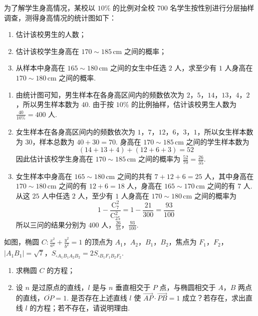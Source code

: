 \begin{problem}
为了解学生身高情况，某校以 \(10\%\) 的比例对全校 \(700\) 名学生按性别进行分层抽样调查，测得身高情况的统计图如下：

\begin{enumerate}
\item 估计该校男生的人数；
\item 估计该校学生身高在 \(170 \sim 185\,\mathrm{cm}\) 之间的概率；
\item 从样本中身高在 \(165 \sim 180\,\mathrm{cm}\) 之间的女生中任选 \(2\) 人，求至少有 \(1\) 人身高在 \(170 \sim 180\,\mathrm{cm}\) 之间的概率.
\end{enumerate}

\end{problem}

\begin{solution}
\begin{enumerate}
\item
由统计图可知，男生样本在各身高区间内的频数依次为 \(2\)，\(5\)，\(14\)，\(13\)，\(4\)，\(2\)，所以男生样本数为 \(40\). 由于按 \(10\%\) 的比例抽样，估计该校男生人数为 \(\frac{40}{10\%}=400\) 人.

\item
女生样本在各身高区间内的频数依次为 \(1\)，\(7\)，\(12\)，\(6\)，\(3\)，\(1\)，所以女生样本数为 \(30\)，样本总数为 \(40+30=70\). 身高在 \(170\sim185\,\mathrm{cm}\) 之间的学生样本数为
\[
(14+13+4)+(12+6+3)=52
\]
因此估计该校学生身高在 \(170\sim185\,\mathrm{cm}\) 之间的概率为 \(\frac{52}{70}=\frac{26}{35}\).

\item
女生样本中身高在 \(165\sim180\,\mathrm{cm}\) 之间的共有 \(7+12+6=25\) 人，其中身高在 \(170\sim180\,\mathrm{cm}\) 之间的有 \(12+6=18\) 人，身高在 \(165\sim170\,\mathrm{cm}\) 之间的有 \(7\) 人. 从这 \(25\) 人中任选 \(2\) 人，至少有 \(1\) 人身高在 \(170\sim180\,\mathrm{cm}\) 之间的概率为
\[
1-\frac{\mathrm C_7^2}{\mathrm C_{25}^2}=1-\frac{21}{300}=\frac{93}{100}
\]
所以三问的结果分别为 \(400\) 人，\(\frac{26}{35}\)，\(\frac{93}{100}\).
\end{enumerate}
\end{solution}

\begin{problem}
如图，椭圆 \(C : \frac{x^2}{a^2} + \frac{y^2}{b^2} = 1\) 的顶点为 \(A_1\)，\(A_2\)，\(B_1\)，\(B_2\)，焦点为 \(F_1\)，\(F_2\)，\(|A_1B_1| = \sqrt{7}\)，\(S_{\square A_1B_1A_2B_2} = 2S_{\square B_1F_1B_2F_2}\).

\begin{enumerate}
\item 求椭圆 \(C\) 的方程；
\item 设 \(n\) 是过原点的直线，\(l\) 是与 \(n\) 垂直相交于 \(P\) 点，与椭圆相交于 \(A\)，\(B\) 两点的直线，\(\overline{OP} = 1\). 是否存在上述直线 \(l\) 使 \(\overrightarrow{AP} \cdot \overrightarrow{PB} = 1\) 成立？若存在，求出直线 \(l\) 的方程；若不存在，请说明理由.
\end{enumerate}

\end{problem}

